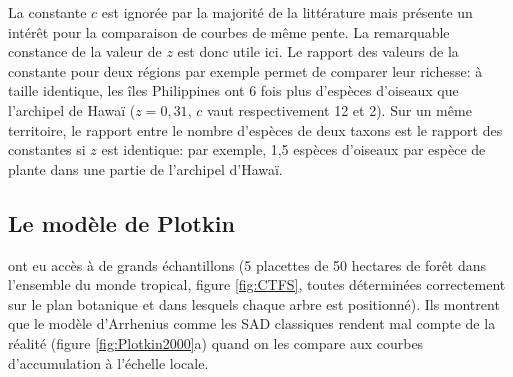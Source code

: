 \documentclass[
  11pt,
  french,
  a4paper,
  extrafontsizes,onecolumn,openright
  ]{memoir}
\begin{document}
La constante \(c\) est ignorée par la majorité de la littérature \autocite{Gould1979} mais présente un intérêt pour la comparaison de courbes de même pente.
La remarquable constance de la valeur de \(z\) est donc utile ici.
Le rapport des valeurs de la constante pour deux régions par exemple permet de comparer leur richesse: à taille identique, les îles Philippines ont 6 fois plus d'espèces d'oiseaux que l'archipel de Hawaï (\(z=0,31\), \(c\) vaut respectivement 12 et 2).
Sur un même territoire, le rapport entre le nombre d'espèces de deux taxons est le rapport des constantes si \(z\) est identique: par exemple, 1,5 espèces d'oiseaux par espèce de plante dans une partie de l'archipel d'Hawaï.

\hypertarget{le-moduxe8le-de-plotkin}{%
\subsection{Le modèle de Plotkin}\label{le-moduxe8le-de-plotkin}}

\textcite{Plotkin2000} ont eu accès à de grands échantillons (5 placettes de 50 hectares de forêt dans l'ensemble du monde tropical, figure \ref{fig:CTFS}, toutes déterminées correctement sur le plan botanique et dans lesquels chaque arbre est positionné).
Ils montrent que le modèle d'Arrhenius comme les SAD classiques rendent mal compte de la réalité (figure \ref{fig:Plotkin2000}a) quand on les compare aux courbes d'accumulation à l'échelle locale.



\scriptsize
\end{document}
